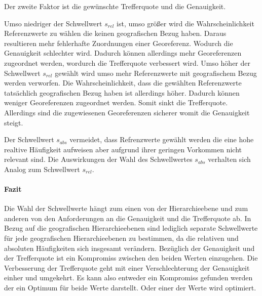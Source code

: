 					Der zweite Faktor ist die gewünschte Trefferquote und die Genauigkeit.

					Umso niedriger der Schwellwert $s_{rel}$ ist, umso größer wird die Wahrscheinlichkeit Referenzwerte zu wählen die keinen geografischen Bezug haben.
					Daraus resultieren mehr fehlerhafte Zuordnungen einer Georeferenz.
					Wodurch die Genauigkeit schlechter wird.
					Dadurch können allerdings mehr Georeferenzen zugeordnet werden, wordurch die Trefferquote verbessert wird.
					Umso höher der Schwellwert $s_{rel}$ gewählt wird umso mehr Referenzwerte mit geografischem Bezug werden verworfen.
					Die Wahrscheinlichkeit, dass die gewählten Referenzwerte tatsächlich geografischen Bezug haben ist allerdings höher.
					Dadurch können weniger Georeferenzen zugeordnet werden.
					Somit sinkt die Trefferquote.
					Allerdings sind die zugewiesenen Georeferenzen sicherer womit die Genauigkeit steigt.

					Der Schwellwert $s_{abs}$ vermeidet, dass Refrenzwerte gewählt werden die eine hohe realtive Häufigkeit aufweisen aber aufgrund ihrer geringen Vorkommen nicht relevant sind.
					Die Auswirkungen der Wahl des Schwellwertes $s_{abs}$ verhalten sich Analog zum Schwellwert $s_{rel}$.

				\paragraph{Fazit}

					Die Wahl der Schwellwerte hängt zum einen von der Hierarchieebene und zum anderen von den Anforderungen an die Genauigkeit und die Trefferquote ab.
					In Bezug auf die geografischen Hierarchieebenen sind lediglich separate Schwellwerte für jede geografischen Hierarchieebenen zu bestimmen, da die relativen und absoluten Häufigkeiten sich insgesamt verändern.
					Bezüglich der Genauigkeit und der Trefferquote ist ein Kompromiss zwischen den beiden Werten einzugehen. 
					Die Verbesserung der Trefferquote geht mit einer Verschlechterung der Genauigkeit einher und umgekehrt.
					Es kann also entweder ein Kompromiss gefunden werden der ein Optimum für beide Werte darstellt. 
					Oder einer der Werte wird optimiert. 
			
		



	
